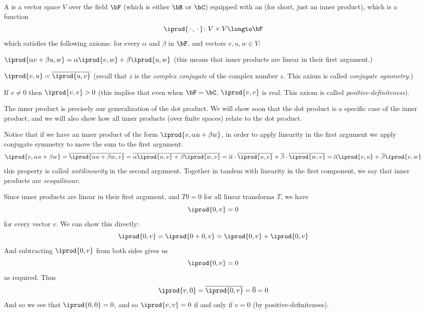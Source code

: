 \begin{defn*}

    A  is a vector space $V$ over the field $\bF$ (which is either $\bR$ or $\bC$) equipped with an  (for short, just an inner product), which is a
    function
    \[ \iprod{\,\cdot\,,\,\cdot\,}\colon V\times V\longto\bF \]
    which satisfies the following axioms: for every $\alpha$ and $\beta$ in $\bF$, and vectors $v,u,w\in V$:
    \benum
        \item $\iprod{\alpha v+\beta u,w} = \alpha\iprod{v,w} + \beta\iprod{u,w}$ (this means that inner products are linear in their first argument.)
        \item $\iprod{v,u}=\overline{\iprod{u,v}}$ (recall that $\overline z$ is the \emph{complex conjugate} of the complex number $z$.
        This axiom is called \emph{conjugate symmetry}.)
        \item If $v\neq0$ then $\iprod{v,v}>0$ (this implies that even when $\bF=\bC$, $\iprod{v,v}$ is real.
        This axiom is called \emph{positive-definiteness}).
    \eenum

\end{defn*}

The inner product is precisely our generalization of the dot product.
We will show soon that the dot product is a specific case of the inner product, and we will also show how all inner products (over finite spaces) relate to the dot product.

Notice that if we have an inner product of the form $\iprod{v,\alpha u+\beta w}$, in order to apply linearity in the first argument we apply conjugate symmetry to move the sum to the first argument:
\[ \iprod{v,\alpha u+\beta w} = \overline{\iprod{\alpha u+\beta w,v}} = \overline{\alpha\iprod{u,v} + \beta\iprod{w,v}} =
\overline\alpha\cdot\overline{\iprod{u,v}} + \overline\beta\cdot\overline{\iprod{w,v}} = \overline\alpha\iprod{v,u} + \overline\beta\iprod{v,w} \]
this property is called \emph{antilinearity} in the second argument.
Together in tandem with linearity in the first component, we say that inner products are \emph{sesquilinear}.

Since inner products are linear in their first argument, and $T0=0$ for all linear transforms $T$, we have
\[ \iprod{0,v} = 0 \]
for every vector $v$.
We can show this directly:
\[ \iprod{0,v} = \iprod{0+0,v} = \iprod{0,v} + \iprod{0,v} \]
And subtracting $\iprod{0,v}$ from both sides gives us
\[ \iprod{0,v} = 0 \]
as required.
Thus
\[ \iprod{v,0} = \overline{\iprod{0,v}} = \overline0 = 0 \]
And so we see that $\iprod{0,0}=0$, and so $\iprod{v,v}=0$ if and only if $v=0$ (by positive-definiteness).

